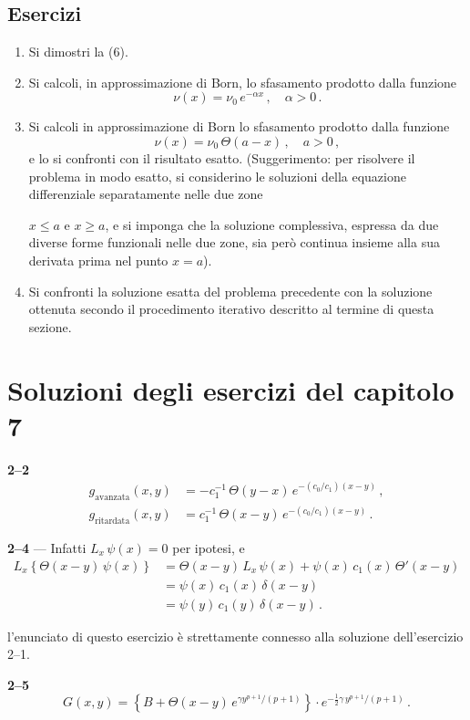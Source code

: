 \documentclass[11pt, a4paper]{book}
\numberwithin{equation}{section}
\newenvironment{esercizi}{\subsection*{Esercizi}\begin{enumerate}}{\end{enumerate}}
\begin{document}
\begin{esercizi}
\item Si dimostri la (6).
\item Si calcoli, in approssimazione di Born, lo sfasamento prodotto dalla funzione
\[
\nu(x) = \nu_0\, e^{-\alpha x}\,, \quad \alpha > 0\,.
\]
\item Si calcoli in approssimazione di Born lo sfasamento prodotto dalla funzione
\[
\nu(x) = \nu_0\,\Theta(a-x)\,, \quad a > 0\,,
\]
e lo si confronti con il risultato esatto.
(Suggerimento: per risolvere il problema in modo esatto, si considerino le soluzioni della equazione differenziale separatamente nelle due zone


$x \leq a$ e $x \geq a$, e si imponga che la soluzione complessiva, espressa da due diverse forme funzionali nelle due zone, sia però continua insieme alla sua derivata prima nel punto $x = a$).

\item[*] Si confronti la soluzione esatta del problema precedente con la soluzione ottenuta secondo il procedimento iterativo descritto al termine di questa sezione.
\end{esercizi}

\section{Soluzioni degli esercizi del capitolo 7}

\noindent\textbf{2--2}
\begin{align*}
g_{\text{avanzata}}(x,y) &= -c_1^{-1}\,\Theta(y-x)\,e^{-(c_0/c_1)(x-y)}\,, \\
g_{\text{ritardata}}(x,y) &= c_1^{-1}\,\Theta(x-y)\,e^{-(c_0/c_1)(x-y)}\,.
\end{align*}

\noindent\textbf{2--4} --- Infatti $L_x\,\psi(x) = 0$ per ipotesi, e
\begin{align*}
L_x\left\{\Theta(x-y)\,\psi(x)\right\} &= \Theta(x-y)\,L_x\,\psi(x) + \psi(x)\,c_1(x)\,\Theta'(x-y) \\
&= \psi(x)\,c_1(x)\,\delta(x-y) \\
&= \psi(y)\,c_1(y)\,\delta(x-y)\,.
\end{align*}

\noindent{} l'enunciato di questo esercizio è strettamente connesso alla soluzione dell'esercizio 2--1.

\noindent\textbf{2--5}
\[
G(x,y) = \left\{B + \Theta(x-y)\,e^{\gamma y^{p+1}/(p+1)}\right\} \cdot e^{-\frac{1}{2}\gamma\, y^{p+1}/(p+1)}\,.
\]
\end{document}
